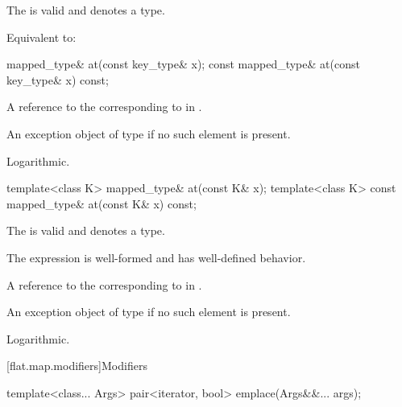 \begin{itemdescr}
\pnum
\constraints
The   is valid and
denotes a type.

\pnum
\effects
Equivalent to: 
\end{itemdescr}

%
\begin{itemdecl}
mapped_type&       at(const key_type& x);
const mapped_type& at(const key_type& x) const;
\end{itemdecl}

\begin{itemdescr}
\pnum
\returns
A reference to the  corresponding
to  in .

\pnum
\throws
An exception object of type  if
no such element is present.

\pnum
\complexity
Logarithmic.
\end{itemdescr}

%
\begin{itemdecl}
template<class K> mapped_type&       at(const K& x);
template<class K> const mapped_type& at(const K& x) const;
\end{itemdecl}

\begin{itemdescr}
\pnum
\constraints
The  
is valid and denotes a type.

\pnum
\expects
The expression  is well-formed and has well-defined behavior.

\pnum
\returns
A reference to the  corresponding to
 in .

\pnum
\throws
An exception object of type 
if no such element is present.

\pnum
\complexity
Logarithmic.
\end{itemdescr}

[flat.map.modifiers]{Modifiers}

%
\begin{itemdecl}
template<class... Args> pair<iterator, bool> emplace(Args&&... args);
\end{itemdecl}

